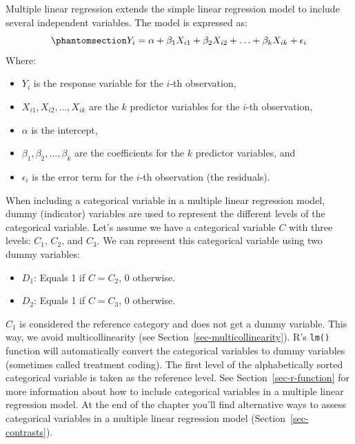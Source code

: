 \documentclass[
  letterpaper,
]{book}
\providecommand{\tightlist}{%
  \setlength{\itemsep}{0pt}\setlength{\parskip}{0pt}}\usepackage{longtable,booktabs,array}
\begin{document}
Multiple linear regression extends the simple linear regression model to
include several independent variables. The model is expressed as:
\begin{equation}\phantomsection\label{eq-mlr1}{Y_i = \alpha + \beta_1 X_{i1} + \beta_2 X_{i2} + \ldots + \beta_k X_{ik} + \epsilon_i}\end{equation}
Where:

\begin{itemize}
\tightlist
\item
  \(Y_i\) is the response variable for the \(i\)-th observation,
\item
  \(X_{i1}, X_{i2}, \ldots, X_{ik}\) are the \(k\) predictor variables
  for the \(i\)-th observation,
\item
  \(\alpha\) is the intercept,
\item
  \(\beta_1, \beta_2, \ldots, \beta_k\) are the coefficients for the
  \(k\) predictor variables, and
\item
  \(\epsilon_i\) is the error term for the \(i\)-th observation (the
  residuals).
\end{itemize}

When including a categorical variable in a multiple linear regression
model, dummy (indicator) variables are used to represent the different
levels of the categorical variable. Let's assume we have a categorical
variable \(C\) with three levels: \(C_1\), \(C_2\), and \(C_3\). We can
represent this categorical variable using two dummy variables:

\begin{itemize}
\tightlist
\item
  \(D_1\): Equals 1 if \(C = C_2\), 0 otherwise.
\item
  \(D_2\): Equals 1 if \(C = C_3\), 0 otherwise.
\end{itemize}

\(C_1\) is considered the reference category and does not get a dummy
variable. This way, we avoid multicollinearity (see
Section~\ref{sec-multicollinearity}). R's \texttt{lm()} function will
automatically convert the categorical variables to dummy variables
(sometimes called treatment coding). The first level of the
alphabetically sorted categorical variable is taken as the reference
level. See Section~\ref{sec-r-function} for more information about how
to include categorical variables in a multiple linear regression model.
At the end of the chapter you'll find alternative ways to assess
categorical variables in a multiple linear regression model
(Section~\ref{sec-contrasts}).
\end{document}
